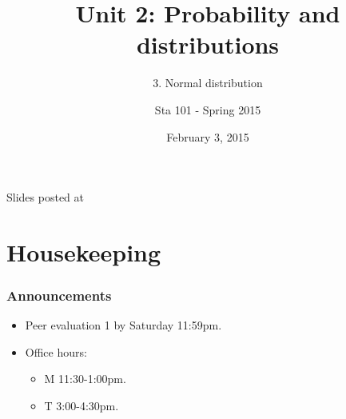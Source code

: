\documentclass[slidestop,compress,mathserif,12pt,t,professionalfonts,xcolor=table]{beamer}
\title{Unit 2: Probability and distributions}
\subtitle{3. Normal distribution}
\author{Sta 101 - Spring 2015}
\date{February 3, 2015}
\institute{Duke University, Department of Statistical Science}
\begin{document}



\begin{frame}[plain]

\titlepage
\vfill
{\scriptsize {} \hfill Slides posted at  \webLink{\CourseSite}{\CourseSite}}
\addtocounter{framenumber}{-1} 

\end{frame}


\section{Housekeeping}


\begin{frame}
\frametitle{Announcements}

\begin{itemize}

\item Peer evaluation 1 by Saturday 11:59pm.

\item Office hours: 



\begin{itemize}
\item M 11:30-1:00pm.
\item T 3:00-4:30pm.
\end{itemize}

\end{itemize}


\end{frame}
\end{document}
